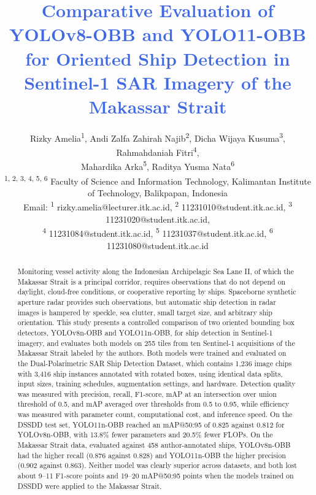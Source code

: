 \documentclass[conference]{IEEEtran}
\begin{document}
\title{\textcolor{RoyalBlue}{Comparative Evaluation of YOLOv8-OBB and YOLO11-OBB for Oriented Ship Detection in Sentinel-1 SAR Imagery of the Makassar Strait}
}

\author{\small Rizky Amelia\textsuperscript{1}, Andi Zalfa Zahirah Najib\textsuperscript{2}, Dicha Wijaya Kusuma\textsuperscript{3}, Rahmahdaniah Fitri\textsuperscript{4},\\
	\small Mahardika Arka\textsuperscript{5}, Raditya Yusma Nata\textsuperscript{6}
	\\
	\textsuperscript{1, 2, 3, 4, 5, 6} Faculty of Science and Information Technology, Kalimantan Institute of Technology, Balikpapan, Indonesia\\
	Email: \textsuperscript{1} \mbox{rizky.amelia@lecturer.itk.ac.id}, \textsuperscript{2} \mbox{11231010@student.itk.ac.id}, \textsuperscript{3} \mbox{11231020@student.itk.ac.id},\\
	\textsuperscript{4} \mbox{11231084@student.itk.ac.id}, \textsuperscript{5} \mbox{11231037@student.itk.ac.id}, \textsuperscript{6} \mbox{11231080@student.itk.ac.id}}

\maketitle

\begin{abstract}
Monitoring vessel activity along the Indonesian Archipelagic Sea Lane II, of which the Makassar Strait is a principal corridor, requires observations that do not depend on daylight, cloud-free conditions, or cooperative reporting by ships. Spaceborne synthetic aperture radar provides such observations, but automatic ship detection in radar images is hampered by speckle, sea clutter, small target size, and arbitrary ship orientation. This study presents a controlled comparison of two oriented bounding box detectors, YOLOv8n-OBB and YOLO11n-OBB, for ship detection in Sentinel-1 imagery, and evaluates both models on 255 tiles from ten Sentinel-1 acquisitions of the Makassar Strait labeled by the authors. Both models were trained and evaluated on the Dual-Polarimetric SAR Ship Detection Dataset, which contains 1,236 image chips with 3,416 ship instances annotated with rotated boxes, using identical data splits, input sizes, training schedules, augmentation settings, and hardware. Detection quality was measured with precision, recall, F1-score, mAP at an intersection over union threshold of 0.5, and mAP averaged over thresholds from 0.5 to 0.95, while efficiency was measured with parameter count, computational cost, and inference speed. On the DSSDD test set, YOLO11n-OBB reached an mAP@50:95 of 0.825 against 0.812 for YOLOv8n-OBB, with 13.8\% fewer parameters and 20.5\% fewer FLOPs. On the Makassar Strait data, evaluated against 458 author-annotated ships, YOLOv8n-OBB had the higher recall (0.876 against 0.828) and YOLO11n-OBB the higher precision (0.902 against 0.863). Neither model was clearly superior across datasets, and both lost about 9--11 F1-score points and 19--20 mAP@50:95 points when the models trained on DSSDD were applied to the Makassar Strait.
\end{abstract}
\end{document}
